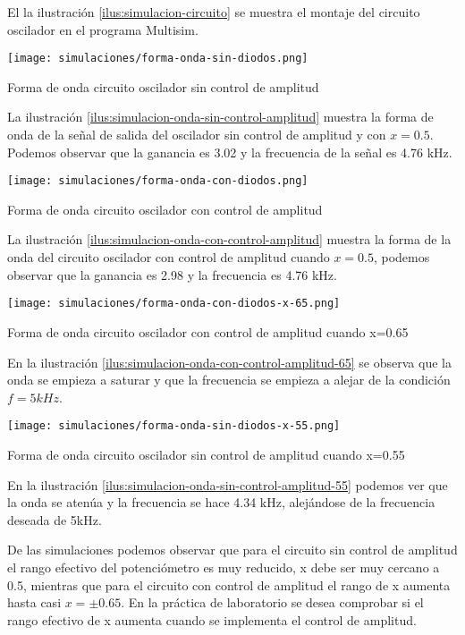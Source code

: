 El la ilustración \ref{ilus:simulacion-circuito} se muestra el montaje del circuito oscilador en el programa Multisim.

\begin{ilustracion}[hb]
    \centering
    \texttt{[image: simulaciones/forma-onda-sin-diodos.png]}
    \caption{Forma de onda circuito oscilador sin control de amplitud}
    \label{ilus:simulacion-onda-sin-control-amplitud}
\end{ilustracion}

La ilustración \ref{ilus:simulacion-onda-sin-control-amplitud} muestra la forma de onda de la señal de salida del oscilador sin control de amplitud y con $x=0.5$. Podemos observar que la ganancia es 3.02 y la frecuencia de la señal es 4.76 kHz.

\begin{ilustracion}[hb]
    \centering
    \texttt{[image: simulaciones/forma-onda-con-diodos.png]}
    \caption{Forma de onda circuito oscilador con control de amplitud}
    \label{ilus:simulacion-onda-con-control-amplitud}
\end{ilustracion}

La ilustración \ref{ilus:simulacion-onda-con-control-amplitud} muestra la forma de la onda del circuito oscilador con control de amplitud cuando $x = 0.5$, podemos observar que la ganancia es 2.98 y la frecuencia es 4.76 kHz.


\begin{ilustracion}[hb]
    \centering
    \texttt{[image: simulaciones/forma-onda-con-diodos-x-65.png]}
    \caption{Forma de onda circuito oscilador con control de amplitud cuando x=0.65}
    \label{ilus:simulacion-onda-con-control-amplitud-65}
\end{ilustracion}

En la ilustración \ref{ilus:simulacion-onda-con-control-amplitud-65} se observa que la onda se empieza a saturar y que la frecuencia se empieza a alejar de la condición $f=5kHz$.

\begin{ilustracion}[hb]
    \centering
    \texttt{[image: simulaciones/forma-onda-sin-diodos-x-55.png]}
    \caption{Forma de onda circuito oscilador sin control de amplitud cuando x=0.55}
    \label{ilus:simulacion-onda-sin-control-amplitud-55}
\end{ilustracion}

En la ilustración \ref{ilus:simulacion-onda-sin-control-amplitud-55} podemos ver que la onda se atenúa y la frecuencia se hace 4.34 kHz, alejándose de la frecuencia deseada de 5kHz.

De las simulaciones podemos observar que para el circuito sin control de amplitud el rango efectivo del potenciómetro es muy reducido, x debe ser muy cercano a 0.5, mientras que para el circuito con control de amplitud el rango de x aumenta hasta casi $x = \pm 0.65$. En la práctica de laboratorio se desea comprobar si el rango efectivo de x aumenta cuando se implementa el control de amplitud.